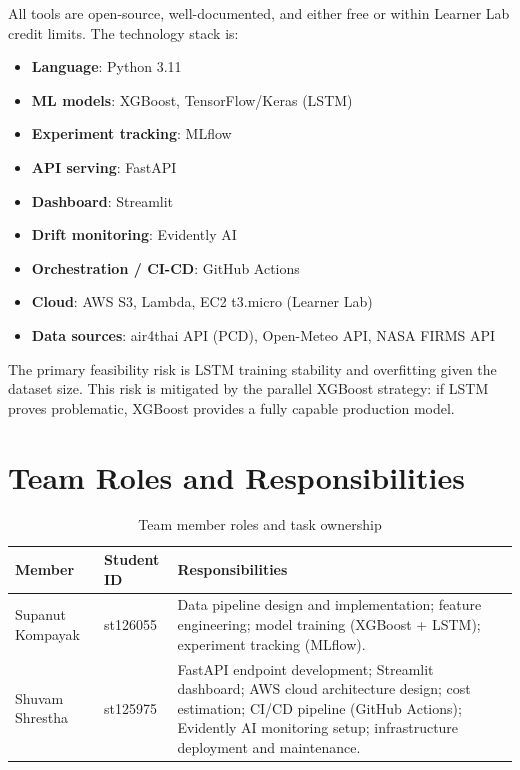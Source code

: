 \documentclass[12pt,a4paper]{report}
\begin{document}
All tools are open-source, well-documented, and either free or within Learner Lab credit limits. The technology stack is:

\begin{itemize}
  \item \textbf{Language}: Python 3.11
  \item \textbf{ML models}: XGBoost, TensorFlow/Keras (LSTM)
  \item \textbf{Experiment tracking}: MLflow
  \item \textbf{API serving}: FastAPI
  \item \textbf{Dashboard}: Streamlit
  \item \textbf{Drift monitoring}: Evidently AI
  \item \textbf{Orchestration / CI-CD}: GitHub Actions
  \item \textbf{Cloud}: AWS S3, Lambda, EC2 t3.micro (Learner Lab)
  \item \textbf{Data sources}: air4thai API (PCD), Open-Meteo API, NASA FIRMS API
\end{itemize}

The primary feasibility risk is LSTM training stability and overfitting given the dataset size. This risk is mitigated by the parallel XGBoost strategy: if LSTM proves problematic, XGBoost provides a fully capable production model.

\section{Team Roles and Responsibilities}

\begin{table}[H]
\centering
\caption{Team member roles and task ownership}
\label{tab:team_roles}
\begin{tabularx}{\textwidth}{@{}llX@{}}
\toprule
\textbf{Member} & \textbf{Student ID} & \textbf{Responsibilities} \\
\midrule
Supanut Kompayak &
  st126055 &
  Data pipeline design and implementation; feature engineering; model training (XGBoost + LSTM); experiment tracking (MLflow). \\[6pt]
Shuvam Shrestha &
  st125975 &
  FastAPI endpoint development; Streamlit dashboard;
  AWS cloud architecture design; cost estimation; CI/CD pipeline (GitHub Actions); Evidently AI monitoring setup; infrastructure deployment and maintenance. \\
\bottomrule
\end{tabularx}
\end{table}
\end{document}
